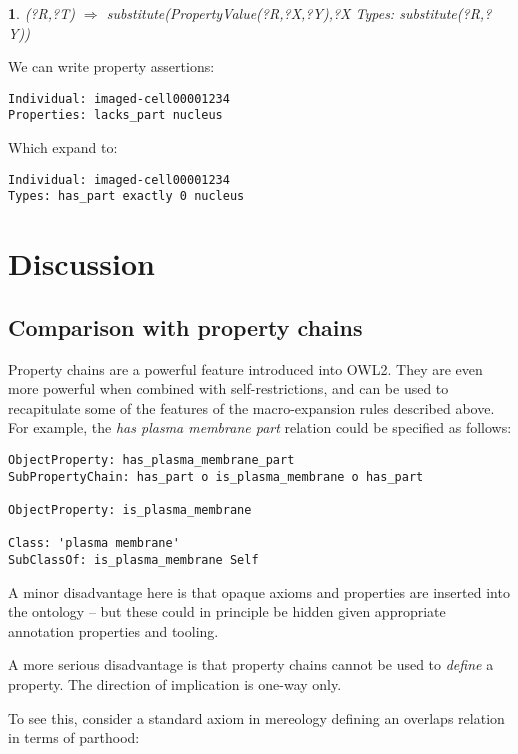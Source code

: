 \documentclass{llncs}
\newtheorem{exprule}{}[section]
\begin{document}
\begin{exprule}\label{exp-inst}
(?R,?T)  $\Rightarrow$ \newline
substitute(PropertyValue(?R,?X,?Y),?X Types: substitute(?R,?Y))
\end{exprule}

We can write property assertions:

\begin{verbatim}
Individual: imaged-cell00001234
Properties: lacks_part nucleus
\end{verbatim}

Which expand to:

\begin{verbatim}
Individual: imaged-cell00001234
Types: has_part exactly 0 nucleus
\end{verbatim}

\section{Discussion}

\subsection{Comparison with property chains}

Property chains are a powerful feature introduced into OWL2. They are
even more powerful when combined with self-restrictions, and can be
used to recapitulate some of the features of the macro-expansion rules
described above. For example, the \emph{has plasma membrane part}
relation could be specified as follows:

\begin{verbatim}
ObjectProperty: has_plasma_membrane_part 
SubPropertyChain: has_part o is_plasma_membrane o has_part

ObjectProperty: is_plasma_membrane

Class: 'plasma membrane'
SubClassOf: is_plasma_membrane Self
\end{verbatim}

A minor disadvantage here is that opaque axioms and properties are
inserted into the ontology -- but these could in principle be hidden
given appropriate annotation properties and tooling.

A more serious disadvantage is that property chains cannot be used to
\emph{define} a property. The direction of implication is one-way
only.

To see this, consider a standard axiom in mereology defining an
overlaps relation in terms of parthood:
\end{document}
